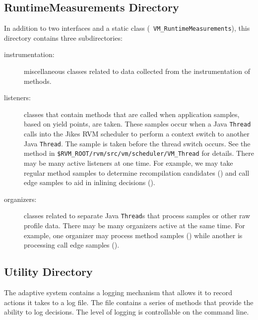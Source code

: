 \subsection{RuntimeMeasurements Directory}
In addition to two interfaces and a static class ({\tt
VM\_RuntimeMeasurements}),
this directory contains three subdirectories:
\begin{description}
\item[instrumentation:] miscellaneous classes related to
data collected from the instrumentation of methods.  

\item[listeners:] classes that contain methods that 
are called when application samples,
based on yield points, are taken.  These samples occur when a Java
{\tt Thread} calls into the Jikes RVM scheduler to perform a context switch
to another Java {\tt Thread}.  The sample is taken before the thread switch occurs.
See the 
 method in
{\tt \$RVM\_ROOT/rvm/src/vm/scheduler/VM\_Thread} for details.
There may be many active listeners at one
time.  For example, we may take regular method samples to determine
recompilation candidates () and call edge 
samples to aid in inlining decisions ().  

\item[organizers:]  classes related to separate Java {\tt Thread}s that
process samples or other raw profile data.  There may be many
organizers active at the same time.
For example, one organizer may process method samples 
() while
another is processing 
call edge samples (). 
\end{description}

\subsection{Utility Directory}
The adaptive system contains a logging mechanism that allows it to
record actions it takes to a log file.  The file  
contains a series of methods that provide the ability to log
decisions.  The level of logging is controllable on the command line.

